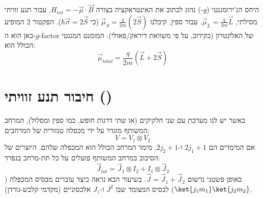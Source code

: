 \begin{examplebox}{היחס הג'ירומגנטי ($g$-)}
נהוג לכתוב את האינטראקציה בצורה $H_{int} = -\vec{\mu} \cdot \vec{B}$.
עבור תנע זוויתי מסילתי, $\vec{\mu}_L = \frac{q}{2m}\vec{L}$.
עבור ספין, קיבלנו $\vec{\mu}_S = \frac{q}{2m}(2\vec{S})$ (כי $\hbar\vec{\sigma} = 2\vec{S}$).
הפקטור 2 המופיע כאן הוא ה-$g$-factor של האלקטרון (בקירוב, על פי משוואת דיראק/פאולי).
המומנט המגנטי הכולל הוא:
$$ \vec{\mu}_{total} = \frac{q}{2m}(\vec{L} + 2\vec{S}) $$
\end{examplebox}

\begin{center}
\end{center}

\section{חיבור תנע זוויתי ()}

כאשר יש לנו מערכת עם שני חלקיקים (או שתי דרגות חופש, כמו ספין ומסלול), המרחב המשותף מוגדר על ידי מכפלה טנזורית של המרחבים:
$$ V = V_1 \otimes V_2 $$
אם המימדים הם $2j_1+1$ ו-$2j_2+1$, מימד המרחב הכולל הוא המכפלה שלהם.
היוצרים של הסיבוב במרחב המשותף פועלים על כל תת-מרחב בנפרד:
$$ \vec{J}_{tot} = \vec{J}_1 \otimes I_2 + I_1 \otimes \vec{J}_2 $$
באופן פשטני נרשום $\vec{J} = \vec{J}_1 + \vec{J}_2$.
בשיעור הבא נראה כיצד עוברים מבסיס המכפלה ($\ket{j_1 m_1}\ket{j_2 m_2}$) לבסיס המצומד שבו $J^2$ ו-$J_z$ אלכסוניים (מקדמי קלבש-גורדן).
